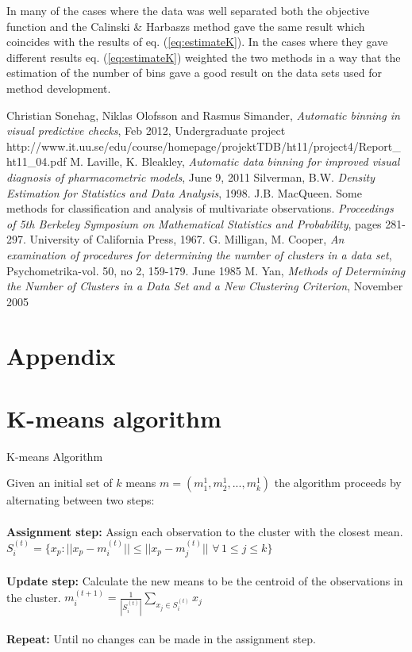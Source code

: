 In many of the cases where the data was well separated both the objective function and the Calinski \& Harbaszs method gave the same result which coincides with the results of eq. (\ref{eq:estimateK}). In the cases where they gave different results eq. (\ref{eq:estimateK}) weighted the two methods in a way that the estimation of the number of bins gave a good result on the data sets used for method development.

\begin{thebibliography}{99}
	 Christian Sonehag, Niklas Olofsson and Rasmus Simander, {\em Automatic binning in visual predictive checks}, Feb 2012, Undergraduate project http://www.it.uu.se/edu/course/homepage/projektTDB/ht11/project4/Report\_ht11\_04.pdf
  M. Laville, K. Bleakley, {\em Automatic data binning for improved visual diagnosis of pharmacometric models}, June 9, 2011
  Silverman, B.W. {\em Density Estimation for Statistics and Data Analysis}, 1998.
  J.B. MacQueen. Some methods for classification and analysis of multivariate observations. {\em Proceedings of 5th Berkeley Symposium on Mathematical Statistics and Probability}, pages 281-297. University of California Press, 1967.
  G. Milligan, M. Cooper, {\em An examination of procedures for determining the number of clusters in a data set}, Psychometrika-vol. 50, no 2, 159-179. June 1985
  M. Yan, {\em Methods of Determining the Number of Clusters in a Data Set and a New Clustering Criterion}, November 2005
\end{thebibliography}


\appendix
\section*{Appendix}
\section{K-means algorithm}
\begin{algorithm}
	\caption{K-means Algorithm}
	Given an initial set of $k$ means $m = (m_1^1, m_2^1, ..., m_k^1)$ the algorithm proceeds by alternating between two steps:
	\\ 
	\\
	{\bf Assignment step: } Assign each observation to the cluster with the closest mean.
	$S_i^{(t)} = \{ x_p : || x_p - m_i^{(t)} || \leq || x_p - m_j^{(t)} || \,\, \forall \, 1 \leq j \leq k \}$ 
	\\
	\\
	{\bf Update step: } Calculate the new means to be the centroid of the observations in the cluster.
	$m_i^{(t+1)} = \frac{1}{| S_i^{(t)} |} \sum_{x_j \in S_i^{(t)}} x_j$
	\\
	\\
	{\bf Repeat: } Until no changes can be made in the assignment step.


\label{kmeans}
	   
\end{algorithm}


